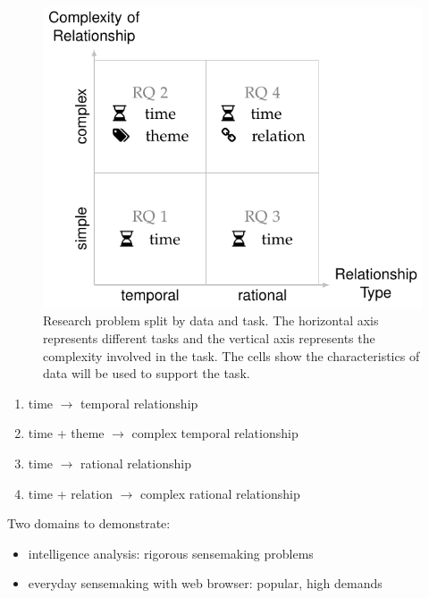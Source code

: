 \begin{figure}[!htb]
	\centering
	\includegraphics{work}
	\caption{Research problem split by data and task. The horizontal axis represents different tasks and the vertical axis represents the complexity involved in the  task. The cells show the characteristics of data will be used to support the task.}
	\label{fig:work}
\end{figure}


\begin{enumerate}
	\item time $\rightarrow$ temporal relationship
	\item time + theme $\rightarrow$ complex temporal relationship
	\item time $\rightarrow$ rational relationship
	\item time + relation $\rightarrow$ complex rational relationship
\end{enumerate}

Two domains to demonstrate:
\begin{itemize}
	\item intelligence analysis: rigorous sensemaking problems
	\item everyday sensemaking with web browser: popular, high demands
\end{itemize}

